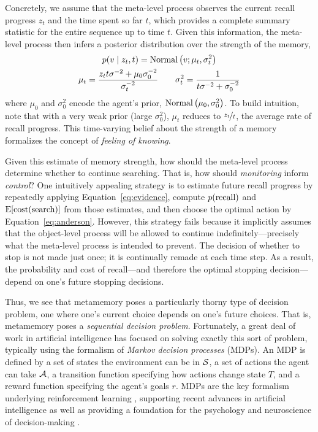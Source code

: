 Concretely, we assume that the meta-level process observes the current recall progress $z_t$ and the time spent so far $t$, which provides a complete summary statistic for the entire sequence up to time $t$. Given this information, the meta-level process then infers a posterior distribution over the strength of the memory,
%
\begin{equation}\label{eq:belief}
\begin{gathered}
  p(v \mid z_t, t) = \mNormal{v; \mu_t, \sigma_t^2} \\
  \mu_t = \frac{z_t t \sigma^{-2} + \mu_0 \sigma_0^{-2}}{\sigma_t^{-2}} 
  \quad\quad
  \sigma^2_t = \frac{1}{t \sigma^{-2} + \sigma_0^{-2}}
\end{gathered}
\end{equation}
%
where $\mu_0$ and $\sigma_0^2$ encode the agent's prior, $\mNormal{\mu_0, \sigma_0^2}$. To build intuition, note that with a very weak prior (large $\sigma_0^2$), $\mu_t$ reduces to $\nicefrac{z_t}{t}$, the average rate of recall progress. This time-varying belief about the strength of a memory formalizes the concept of \emph{feeling of knowing}.

Given this estimate of memory strength, how should the meta-level process determine whether to continue searching. That is, how should \emph{monitoring} inform \emph{control}? One intuitively appealing strategy is to estimate future recall progress by repeatedly applying Equation~\ref{eq:evidence}, compute $p\recall$ and $\E[\text{cost}(\text{search})]$ from those estimates, and then choose the optimal action by Equation~\ref{eq:anderson}. However, this strategy fails because it implicitly assumes that the object-level process will be allowed to continue indefinitely---precisely what the meta-level process is intended to prevent. The decision of whether to stop is not made just once; it is continually remade at each time step. As a result, the probability and cost of recall---and therefore the optimal stopping decision---depend on one's future stopping decisions.

Thus, we see that metamemory poses a particularly thorny type of decision problem, one where one's current choice depends on one's future choices. That is, metamemory poses a \emph{sequential decision problem}. Fortunately, a great deal of work in artificial intelligence has focused on solving exactly this sort of problem, typically using the formalism of \emph{Markov decision processes} (MDPs). An MDP is defined by a set of states the environment can be in $\S$, a set of actions the agent can take $\A$, a transition function specifying how actions change state $T$, and a reward function specifying the agent's goals $r$. MDPs are the key formalism underlying reinforcement learning \citep{sutton2018reinforcement}, supporting recent advances in artificial intelligence \citep{mnih2015human,silver2017mastering} as well as providing a foundation for the psychology and neuroscience of decision-making \citep{niv2009reinforcement,dayan2008decision,glimcher2011understanding}.

